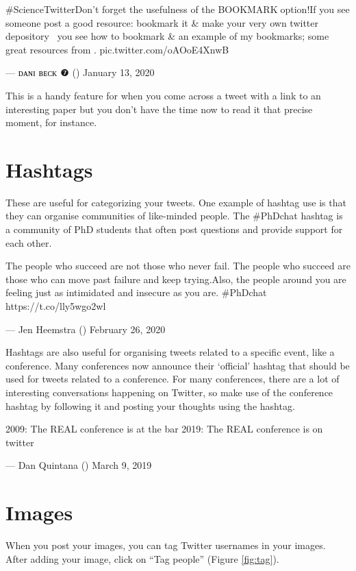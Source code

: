 \documentclass[]{book}
\begin{document}
\#ScienceTwitterDon't forget the usefulness of the BOOKMARK🔖option!If you see someone post a good resource: bookmark it \& make your very own twitter depository🔖👇🏾you see how to bookmark \& an example of my bookmarks; some great resources from \citet{dsquintana}.\citet{AcademicChatter} pic.twitter.com/oAOoE4XnwB

--- ᴅᴀɴɪ ʙᴇᴄᴋ ❼ (\citet{_DaniBeck}) January 13, 2020

This is a handy feature for when you come across a tweet with a link to an interesting paper but you don't have the time now to read it that precise moment, for instance.

\hypertarget{hashtags}{%
\section{Hashtags}\label{hashtags}}

These are useful for categorizing your tweets. One example of hashtag use is that they can organise communities of like-minded people. The \#PhDchat hashtag is a community of PhD students that often post questions and provide support for each other.

The people who succeed are not those who never fail. The people who succeed are those who can move past failure and keep trying.Also, the people around you are feeling just as intimidated and insecure as you are. \#PhDchat https://t.co/lly5wgo2wl

--- Jen Heemstra (\citet{jenheemstra}) February 26, 2020

Hashtags are also useful for organising tweets related to a specific event, like a conference. Many conferences now announce their `official' hashtag that should be used for tweets related to a conference. For many conferences, there are a lot of interesting conversations happening on Twitter, so make use of the conference hashtag by following it and posting your thoughts using the hashtag.

2009: The REAL conference is at the bar 2019: The REAL conference is on twitter

--- Dan Quintana (\citet{dsquintana}) March 9, 2019

\hypertarget{images}{%
\section{Images}\label{images}}

When you post your images, you can tag Twitter usernames in your images. After adding your image, click on ``Tag people'' (Figure \ref{fig:tag}).
\end{document}
